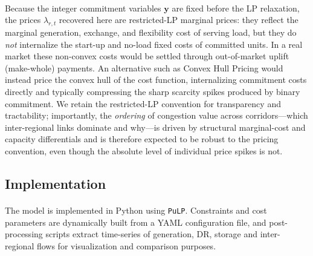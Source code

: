 \documentclass[12pt]{article}
\begin{document}
\paragraph{}
Because the integer commitment variables $\mathbf{y}$ are fixed before the LP relaxation, the prices $\lambda_{r,t}$ recovered here are restricted-LP marginal prices: they reflect the marginal generation, exchange, and flexibility cost of serving load, but they do \emph{not} internalize the start-up and no-load fixed costs of committed units. In a real market these non-convex costs would be settled through out-of-market uplift (make-whole) payments. An alternative such as Convex Hull Pricing \citep{gribik2007} would instead price the convex hull of the cost function, internalizing commitment costs directly and typically compressing the sharp scarcity spikes produced by binary commitment. We retain the restricted-LP convention for transparency and tractability; importantly, the \emph{ordering} of congestion value across corridors---which inter-regional links dominate and why---is driven by structural marginal-cost and capacity differentials and is therefore expected to be robust to the pricing convention, even though the absolute level of individual price spikes is not.



\subsection{Implementation}

\paragraph{}
The model is implemented in Python using \texttt{PuLP}. Constraints and cost parameters are dynamically built from a YAML configuration file, and post-processing scripts extract time-series of generation, DR, storage and inter-regional flows for visualization and comparison purposes.
\end{document}
